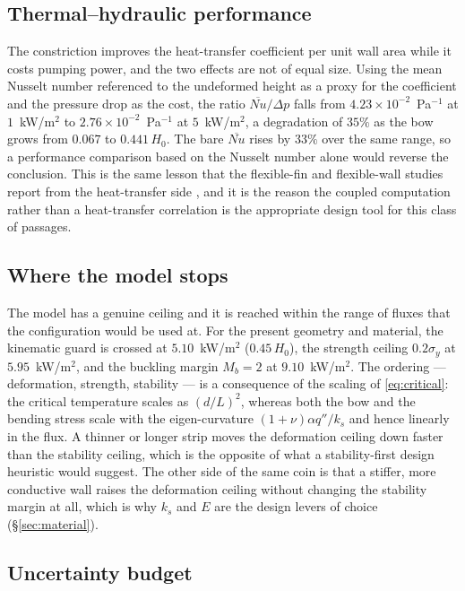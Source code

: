 \documentclass[11pt,a4paper]{article}
\begin{document}
\subsection{Thermal--hydraulic performance}
\label{sec:performance}

The constriction improves the heat-transfer coefficient per unit wall area
while it costs pumping power, and the two effects are not of equal size. Using
the mean Nusselt number referenced to the undeformed height as a proxy for the
coefficient and the pressure drop as the cost, the ratio $\overline{Nu}/\Delta p$
falls from $4.23\times10^{-2}$~Pa$^{-1}$ at $1$~kW/m$^2$ to
$2.76\times10^{-2}$~Pa$^{-1}$ at $5$~kW/m$^2$, a degradation of $35\%$ as the
bow grows from $0.067$ to $0.441\,H_0$. The bare $\overline{Nu}$ rises by
$33\%$ over the same range, so a performance comparison based on the Nusselt
number alone would reverse the conclusion. This is the same lesson that the
flexible-fin and flexible-wall studies report from the heat-transfer side
\citep{soti2015flow,derakhshandeh2026fluid,chowdhury2025fluid}, and it is the
reason the coupled computation rather than a heat-transfer correlation is the
appropriate design tool for this class of passages.

\subsection{Where the model stops}
\label{sec:wherestop}

The model has a genuine ceiling and it is reached within the range of fluxes
that the configuration would be used at. For the present geometry and
material, the kinematic guard is crossed at $5.10$~kW/m$^2$
($0.45\,H_0$), the strength ceiling $0.2\sigma_y$ at $5.95$~kW/m$^2$, and the
buckling margin $M_b=2$ at $9.10$~kW/m$^2$. The ordering --- deformation,
strength, stability --- is a consequence of the scaling of
\eqref{eq:critical}: the critical temperature scales as $(d/L)^2$, whereas
both the bow and the bending stress scale with the eigen-curvature
$(1+\nu)\alpha q''/k_s$ and hence linearly in the flux. A thinner or longer
strip moves the deformation ceiling down faster than the stability ceiling,
which is the opposite of what a stability-first design heuristic would
suggest. The other side of the same coin is that a stiffer, more conductive
wall raises the deformation ceiling without changing the stability margin at
all, which is why $k_s$ and $E$ are the design levers of choice
(\S\ref{sec:material}).

\subsection{Uncertainty budget}
\label{sec:uncertainty}
\end{document}
